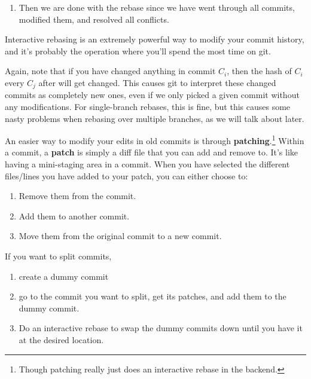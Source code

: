 \begin{definition}[Rebasing]
\begin{enumerate}
      \item Then we are done with the rebase since we have went through all commits, modified them, and resolved all conflicts. 
    \end{enumerate}
    Interactive rebasing is an extremely powerful way to modify your commit history, and it's probably the operation where you'll spend the most time on git. 
  \end{definition} 

  Again, note that if you have changed anything in commit $C_i$, then the hash of $C_i$ every $C_j$ after will get changed. This causes git to interpret these changed commits as completely new ones, even if we only picked a given commit without any modifications. For single-branch rebases, this is fine, but this causes some nasty problems when rebasing over multiple branches, as we will talk about later. 

  \begin{definition}[Patching]
    An easier way to modify your edits in old commits is through \textbf{patching}.\footnote{Though patching really just does an interactive rebase in the backend.} Within a commit, a \textbf{patch} is simply a diff file that you can add and remove to. It's like having a mini-staging area in a commit. When you have selected the different files/lines you have added to your patch, you can either choose to: 
    \begin{enumerate}
      \item Remove them from the commit. 
      \item Add them to another commit. 
      \item Move them from the original commit to a new commit. 
    \end{enumerate}
  \end{definition}

  \begin{theorem}
    If you want to split commits, 
    \begin{enumerate}
      \item create a dummy commit 
      \item go to the commit you want to split, get its patches, and add them to the dummy commit. 
      \item Do an interactive rebase to swap the dummy commits down until you have it at the desired location. 
    \end{enumerate}
  \end{theorem} 

